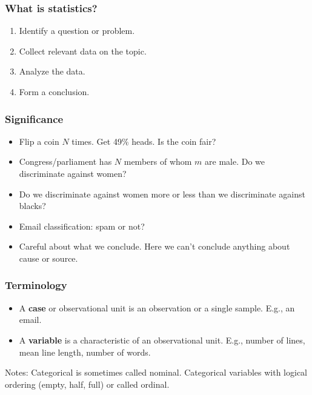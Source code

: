 \documentclass[t]{beamer}
\begin{document}
\begin{frame}
  \frametitle{What is statistics?}
  \begin{enumerate}
  \item<1-> Identify a question or problem.
  \item<1-> Collect relevant data on the topic.
  \item<1-> Analyze the data.
  \item<1-> Form a conclusion.
  \end{enumerate}

\end{frame}


\begin{frame}
  \frametitle{Significance}

  \begin{itemize}
  \item Flip a coin $N$ times.  Get 49\% heads.  Is the coin fair?
  \item Congress/parliament has $N$ members of whom $m$ are male.  Do
    we discriminate against women?
  \item Do we discriminate against women more or less than we
    discriminate against blacks?
  \item Email classification: spam or not?
  \item Careful about what we conclude.  Here we can't conclude
    anything about cause or source.
  \end{itemize}

  
\end{frame}

\begin{frame}
  \frametitle{Terminology}

  \begin{itemize}
  \item A \textbf{case} or {observational unit} is an observation or a
    single sample.  E.g., an email.
  \item A \textbf{variable} is a characteristic of an observational
    unit.  E.g., number of lines, mean line length, number of words.
  \end{itemize}

  Notes:  Categorical is sometimes called nominal.  Categorical
  variables with logical ordering (empty, half, full) or called ordinal.
\end{frame}
\end{document}
